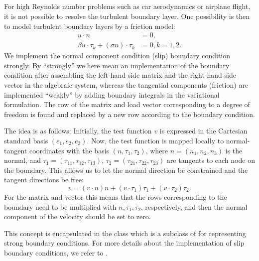 \subsection{}

For high Reynolds number problems such as car aerodynamics or airplane
flight, it is not possible to resolve the turbulent boundary
layer. One possibility is then to model turbulent boundary layers by a
friction model:
\begin{align}
u \cdot n &= 0,
\\
\beta u \cdot \tau_k + (\sigma n) \cdot \tau_k &= 0, k = 1, 2.
\end{align}
We implement the normal component condition (slip) boundary condition
strongly. By ``strongly'' we here mean an implementation of the
boundary condition after assembling the left-hand side matrix and the
right-hand side vector in the algebraic system, whereas the tangential
components (friction) are implemented ``weakly'' by adding boundary
integrals in the variational formulation. The row of the matrix and
load vector corresponding to a degree of freedom is found and replaced
by a new row according to the boundary condition.

The idea is as follows: Initially, the test function $v$ is expressed
in the Cartesian standard basis $(e_1, e_2, e_3)$.  Now, the test
function is mapped locally to normal-tangent coordinates with the
basis $(n, \tau_1, \tau_2)$, where $n = (n_1, n_2, n_3)$ is the
normal, and $\tau_1 = (\tau_{11}, \tau_{12}, \tau_{13})$, $\tau_2 =
(\tau_{21}, \tau_{22}, \tau_{23})$ are tangents to each node on the
boundary. This allows us to let the normal direction be constrained
and the tangent directions be free:
\begin{equation}
  v = (v \cdot n)n + (v \cdot \tau_1) \tau_1 + (v \cdot \tau_2) \tau_2.
\end{equation}
For the matrix and vector this means that the rows corresponding to the
boundary need to be multiplied with $n,\tau_1,\tau_2$, respectively,
and then the normal component of the velocity should be set to zero.

This concept is encapsulated in the class  which is a
subclass of  for representing strong
boundary conditions. For more details about the implementation of slip
boundary conditions, we refer to \citet{Nazarov2011}.

\subsection{}


